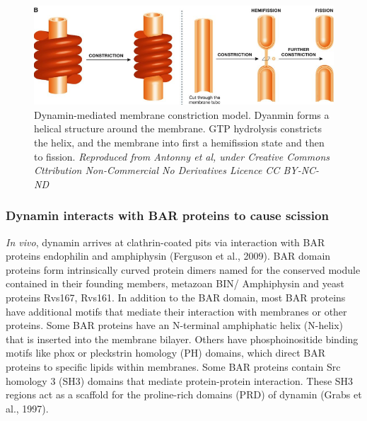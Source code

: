 		
	\begin{figure}[H]
			\centering
			\includegraphics[scale=0.5]{figures/intro/dynamin_2}
\caption[Dynamin forms a scaffold]
					{Dynamin-mediated membrane constriction model. Dyanmin forms a helical structure around the membrane. GTP hydrolysis constricts the helix, and the membrane into first a hemifission state and then to fission.
					\textit{Reproduced from Antonny et al, under Creative Commons Cttribution Non-Commercial No Derivatives Licence CC BY-NC-ND}
		\label{intro_dynamin_scission}}
		\end{figure}



		\subsubsection{Dynamin interacts with BAR proteins to cause scission}
\textit{In vivo}, dynamin arrives at clathrin-coated pits via interaction with BAR proteins endophilin and amphiphysin (Ferguson et al., 2009). BAR domain proteins form intrinsically curved protein dimers named for the conserved module contained in their founding members, metazoan BIN/ Amphiphysin and yeast proteins Rvs167, Rvs161. In addition to the BAR domain, most BAR proteins have additional motifs that mediate their interaction with membranes or other proteins. Some BAR proteins have an N-terminal amphiphatic helix (N-helix) that is inserted into the membrane bilayer.  Others have phosphoinositide binding motifs like phox or pleckstrin homology (PH) domains, which direct BAR proteins to specific lipids within membranes. Some BAR proteins contain Src homology 3 (SH3) domains that mediate protein-protein interaction. These SH3 regions act as a scaffold for the proline-rich domains (PRD) of dynamin (Grabs et al., 1997). 



